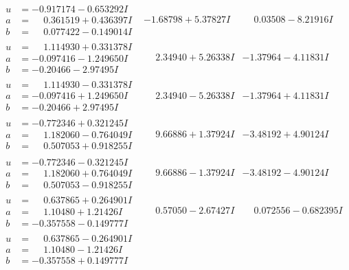 \documentclass[1p]{elsarticle_modified}
\theoremstyle{definition}
\begin{document}
$$\begin{array}{c|c|c}
\begin{aligned}
u &= -0.917174 - 0.653292 I \\
a &= \phantom{-}0.361519 + 0.436397 I \\
b &= \phantom{-}0.077422 - 0.149014 I\end{aligned}
 & -1.68798 + 5.37827 I & \phantom{-}0.03508 - 8.21916 I \\ \hline\begin{aligned}
u &= \phantom{-}1.114930 + 0.331378 I \\
a &= -0.097416 - 1.249650 I \\
b &= -0.20466 - 2.97495 I\end{aligned}
 & \phantom{-}2.34940 + 5.26338 I & -1.37964 - 4.11831 I \\ \hline\begin{aligned}
u &= \phantom{-}1.114930 - 0.331378 I \\
a &= -0.097416 + 1.249650 I \\
b &= -0.20466 + 2.97495 I\end{aligned}
 & \phantom{-}2.34940 - 5.26338 I & -1.37964 + 4.11831 I \\ \hline\begin{aligned}
u &= -0.772346 + 0.321245 I \\
a &= \phantom{-}1.182060 - 0.764049 I \\
b &= \phantom{-}0.507053 + 0.918255 I\end{aligned}
 & \phantom{-}9.66886 + 1.37924 I & -3.48192 + 4.90124 I \\ \hline\begin{aligned}
u &= -0.772346 - 0.321245 I \\
a &= \phantom{-}1.182060 + 0.764049 I \\
b &= \phantom{-}0.507053 - 0.918255 I\end{aligned}
 & \phantom{-}9.66886 - 1.37924 I & -3.48192 - 4.90124 I \\ \hline\begin{aligned}
u &= \phantom{-}0.637865 + 0.264901 I \\
a &= \phantom{-}1.10480 + 1.21426 I \\
b &= -0.357558 - 0.149777 I\end{aligned}
 & \phantom{-}0.57050 - 2.67427 I & \phantom{-}0.072556 - 0.682395 I \\ \hline\begin{aligned}
u &= \phantom{-}0.637865 - 0.264901 I \\
a &= \phantom{-}1.10480 - 1.21426 I \\
b &= -0.357558 + 0.149777 I\end{aligned}

\end{array}$$
\end{document}

